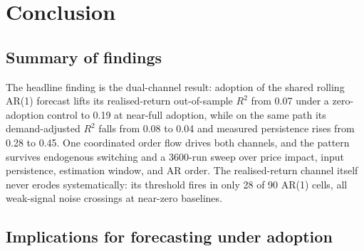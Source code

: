 \documentclass[12pt]{article}
\begin{document}
\section{Conclusion}\label{sec:conclusion}

\subsection{Summary of findings}

The headline finding is the dual-channel result: adoption of the shared rolling AR(1) forecast lifts its realised-return out-of-sample $R^{2}$ from 0.07 under a zero-adoption control to 0.19 at near-full adoption, while on the same path its demand-adjusted $R^{2}$ falls from 0.08 to 0.04 and measured persistence rises from 0.28 to 0.45. %
One coordinated order flow drives both channels, and the pattern survives endogenous switching and a 3600-run sweep over price impact, input persistence, estimation window, and AR order. %
The realised-return channel itself never erodes systematically: its threshold fires in only 28 of 90 AR(1) cells, all weak-signal noise crossings at near-zero baselines. %

\subsection{Implications for forecasting under adoption}
\end{document}
